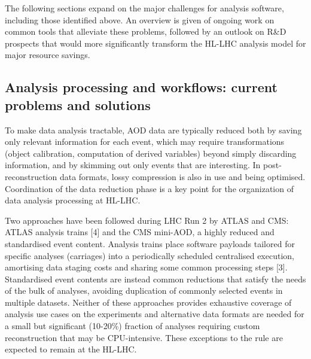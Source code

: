 \documentclass[10pt,a4paper]{article}
\begin{document}
The following sections expand on the major challenges for analysis
software, including those identified above. An overview is given of
ongoing work on common tools that alleviate these problems, followed by
an outlook on R\&D prospects that would more significantly transform the
HL-LHC analysis model for major resource savings.

\hypertarget{analysis-processing-and-workflows-current-problems-and-solutions}{%
\subsection{Analysis processing and workflows: current problems and
solutions}\label{analysis-processing-and-workflows-current-problems-and-solutions}}

To make data analysis tractable, AOD data are typically reduced both by
saving only relevant information for each event, which may require
transformations (object calibration, computation of derived variables)
beyond simply discarding information, and by skimming out only events
that are interesting. In post-reconstruction data formats, lossy
compression is also in use and being optimised. Coordination of the data
reduction phase is a key point for the organization of data analysis
processing at HL-LHC.

Two approaches have been followed during LHC Run 2 by ATLAS and CMS:
ATLAS analysis trains {[}4{]} and the CMS mini-AOD, a highly reduced and
standardised event content. Analysis trains place software payloads
tailored for specific analyses (carriages) into a periodically scheduled
centralised execution, amortising data staging costs and sharing some
common processing steps {[}3{]}. Standardised event contents are instead
common reductions that satisfy the needs of the bulk of analyses,
avoiding duplication of commonly selected events in multiple datasets.
Neither of these approaches provides exhaustive coverage of analysis use
cases on the experiments and alternative data formats are needed for a
small but significant (10-20\%) fraction of analyses requiring custom
reconstruction that may be CPU-intensive. These exceptions to the rule
are expected to remain at the HL-LHC.
\end{document}
